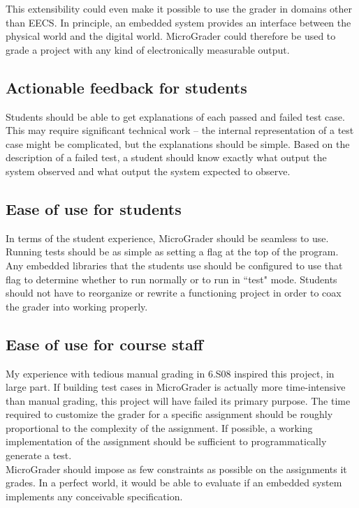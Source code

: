 \documentclass[12pt]{article}
\begin{document}
This extensibility could even make it possible to use the grader in domains other than EECS.  In principle, an embedded system provides an interface between the physical world and the digital world.  MicroGrader could therefore be used to grade a project with any kind of electronically measurable output.

\subsection{Actionable feedback for students}
Students should be able to get explanations of each passed and failed test case.  This may require significant technical work -- the internal representation of a test case might be complicated, but the explanations should be simple.  Based on the description of a failed test, a student should know exactly what output the system observed and what output the system expected to observe.

\subsection{Ease of use for students}
In terms of the student experience, MicroGrader should be seamless to use.  Running tests should be as simple as setting a flag at the top of the program.  Any embedded libraries that the students use should be configured to use that flag to determine whether to run normally or to run in ``test" mode.  Students should not have to reorganize or rewrite a functioning project in order to coax the grader into working properly.

\subsection{Ease of use for course staff}
My experience with tedious manual grading in 6.S08 inspired this project, in large part.  If building test cases in MicroGrader is actually more time-intensive than manual grading, this project will have failed its primary purpose.  The time required to customize the grader for a specific assignment should be roughly proportional to the complexity of the assignment.  If possible, a working implementation of the assignment should be sufficient to programmatically generate a test.\\

MicroGrader should impose as few constraints as possible on the assignments it grades.  In a perfect world, it would be able to evaluate if an embedded system implements any conceivable specification.
\end{document}
